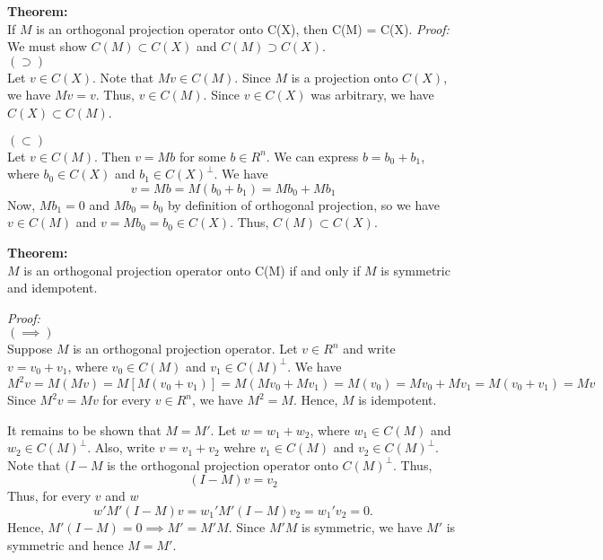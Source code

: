 \documentclass[12pt]{article}
\numberwithin{equation}{section}
\begin{document}
\textbf{Theorem:} \\
If $M$ is an orthogonal projection operator onto C(X), then C(M) = C(X).
\textit{Proof:} \\
We must show $C(M) \subset C(X)$ and $C(M) \supset C(X)$. \\
$(\supset)$ \\
Let $v \in C(X)$. Note that $Mv \in C(M)$. Since $M$ is a projection onto $C(X)$, we have $Mv = v$. Thus, $v \in C(M)$. Since $v \in C(X)$ was arbitrary, we have $C(X) \subset C(M)$.

$(\subset)$ \\
Let $v \in C(M)$. Then $v = Mb$ for some $b \in R^n$. We can express $b = b_0 + b_1$, where $b_0 \in C(X)$ and $b_1 \in C(X)^{\perp}$. We have
\begin{equation*}
  v = Mb = M(b_0 + b_1) = Mb_0 + Mb_1
\end{equation*}
Now, $Mb_1 = 0$ and $Mb_0 = b_0$ by definition of orthogonal projection, so we have $v \in C(M)$ and $v = Mb_0 = b_0 \in C(X)$. Thus, $C(M) \subset C(X)$.

\textbf{Theorem:} \\
$M$ is an orthogonal projection operator onto C(M) if and only if $M$ is symmetric and idempotent.

\textit{Proof:} \\
$(\implies) $ \\
Suppose $M$ is an orthogonal projection operator. Let $v \in R^n$ and write $v = v_0 + v_1$, where $v_0 \in C(M)$ and $v_1 \in C(M)^{\perp}$. We have
\begin{equation*}
  M^2v = M(Mv) = M[M(v_0 + v_1)] = M(Mv_0 + Mv_1) = M(v_0) = Mv_0 + Mv_1 = M(v_0 + v_1) = Mv
\end{equation*}
Since $M^2v = Mv$ for every $v \in R^n$, we have $M^2 = M$. Hence, $M$ is idempotent.

It remains to be shown that $M = M'$. Let $w = w_1 + w_2$, where $w_1 \in C(M)$ and $w_2 \in C(M)^{\perp}$. Also, write $v = v_1 + v_2$ wehre $v_1 \in C(M)$ and $v_2 \in C(M)^{\perp}$. Note that $(I - M$ is the orthogonal projection operator onto $C(M)^{\perp}$. Thus, 
\begin{equation*}
  (I - M)v = v_2
\end{equation*}
Thus, for every $v$ and $w$
\begin{equation*}
 w'M'(I - M)v = w_1' M' (I - M)v_2 = w_1'v_2 = 0.
\end{equation*}
Hence, $M'(I - M) = 0 \implies M' = M'M$. Since $M'M$ is symmetric, we have $M'$ is symmetric and hence $M = M'$.
\end{document}
